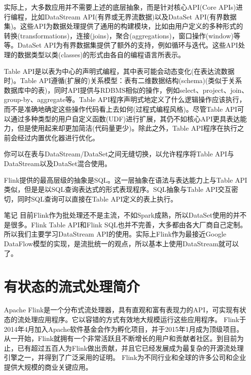 \documentclass[oneside]{ctexbook}
\begin{document}
实际上，大多数应用并不需要上述的底层抽象，而是针对核心API(Core APIs)进行编程，比如DataStream API(有界或无界流数据)以及DataSet API(有界数据集)。这些API为数据处理提供了通用的构建模块，比如由用户定义的多种形式的转换(transformations)，连接(joins)，聚合(aggregations)，窗口操作(window)等等。DataSet API为有界数据集提供了额外的支持，例如循环与迭代。这些API处理的数据类型以类(classes)的形式由各自的编程语言所表示。

Table API是以表为中心的声明式编程，其中表可能会动态变化(在表达流数据时)。Table API遵循(扩展的)关系模型：表有二维数据结构(schema)(类似于关系数据库中的表)，同时API提供与RDBMS相似的操作，例如select、project、join、group-by、aggregate等。Table API程序声明式地定义了什么逻辑操作应该执行，而不是准确地确定这些操作代码看上去如何(过程式编程风格)。尽管Table API可以通过多种类型的用户自定义函数(UDF)进行扩展，其仍不如核心API更具表达能力，但是使用起来却更加简洁(代码量更少)。除此之外，Table API程序在执行之前会经过内置优化器进行优化。

你可以在表与DataStream/DataSet之间无缝切换，以允许程序将Table API与DataStream以及DataSet混合使用。

Flink提供的最高层级的抽象是SQL。这一层抽象在语法与表达能力上与Table API类似，但是是以SQL查询表达式的形式表现程序。SQL抽象与Table API交互密切，同时SQL查询可以直接在Table API定义的表上执行。

\begin{bclogo}[logo=\bcinfo, couleurBarre=orange, noborder=true, couleur=white]{笔记}
目前Flink作为批处理还不是主流，不如Spark成熟，所以DataSet使用的并不是很多。Flink Table API和Flink SQL也并不完善，大多都由各大厂商自己定制。所以我们主要学习DataStream API的使用。实际上Flink作为最接近Google DataFlow模型的实现，是流批统一的观点，所以基本上使用DataStream就可以了。
\end{bclogo}

\chapter{有状态的流式处理简介}

Apache Flink是一个分布式流处理器，具有直观和富有表现力的API，可实现有状态的流处理应用程序。它以容错的方式有效地大规模运行这些应用程序。 Flink于2014年4月加入Apache软件基金会作为孵化项目，并于2015年1月成为顶级项目。从一开始，Flink就拥有一个非常活跃且不断增长的用户和贡献者社区。到目前为止，已有超过五百人为Flink做出贡献，并且它已经发展成为最复杂的开源流处理引擎之一，并得到了广泛采用的证明。 Flink为不同行业和全球的许多公司和企业提供大规模的商业关键应用。
\end{document}
